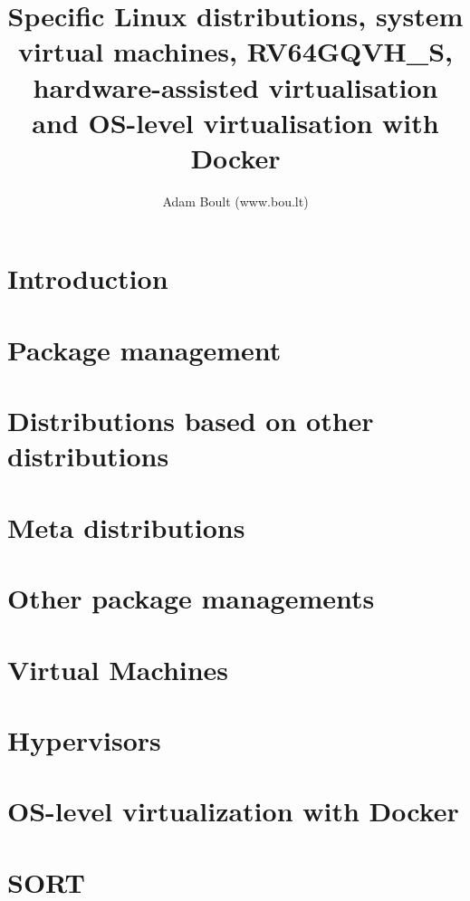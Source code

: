 \documentclass[oneside]{book}
\begin{document}
\author{Adam Boult (www.bou.lt)}
\title{Specific Linux distributions, system virtual machines, RV64GQVH\_S, hardware-assisted virtualisation and OS-level virtualisation with Docker}
\maketitle

\setcounter{tocdepth}{0}
\tableofcontents



\part{Introduction}


\part{Package management}











\part{Distributions based on other distributions}


\part{Meta distributions}


\part{Other package managements}



\part{Virtual Machines}


\part{Hypervisors}

\part{OS-level virtualization with Docker}


\part{SORT}

\end{document}
